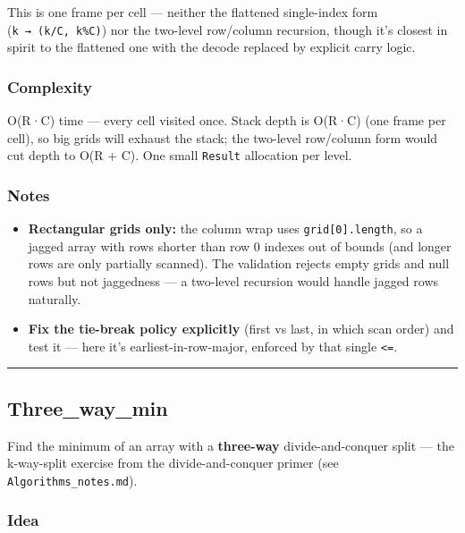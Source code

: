 \documentclass[
  10pt,
  letterpaper,
  onecolumn]{article}
\providecommand{\tightlist}{%
  \setlength{\itemsep}{0pt}\setlength{\parskip}{0pt}}
\begin{document}
This is one frame per cell --- neither the flattened single-index form
(\texttt{k\ →\ (k/C,\ k\%C)}) nor the two-level row/column recursion,
though it's closest in spirit to the flattened one with the decode
replaced by explicit carry logic.

\hypertarget{complexity-4}{%
\subsubsection{Complexity}\label{complexity-4}}

O(R·C) time --- every cell visited once. Stack depth is O(R·C) (one
frame per cell), so big grids will exhaust the stack; the two-level
row/column form would cut depth to O(R + C). One small \texttt{Result}
allocation per level.

\hypertarget{notes-3}{%
\subsubsection{Notes}\label{notes-3}}

\begin{itemize}
\tightlist
\item
  \textbf{Rectangular grids only:} the column wrap uses
  \texttt{grid{[}0{]}.length}, so a jagged array with rows shorter than
  row 0 indexes out of bounds (and longer rows are only partially
  scanned). The validation rejects empty grids and null rows but not
  jaggedness --- a two-level recursion would handle jagged rows
  naturally.
\item
  \textbf{Fix the tie-break policy explicitly} (first vs last, in which
  scan order) and test it --- here it's earliest-in-row-major, enforced
  by that single \texttt{\textless{}=}.
\end{itemize}

\begin{center}\rule{0.5\linewidth}{0.5pt}\end{center}

\hypertarget{three_way_min}{%
\subsection{Three\_way\_min}\label{three_way_min}}

Find the minimum of an array with a \textbf{three-way}
divide-and-conquer split --- the k-way-split exercise from the
divide-and-conquer primer (see \texttt{Algorithms\_notes.md}).

\hypertarget{idea-5}{%
\subsubsection{Idea}\label{idea-5}}
\end{document}
